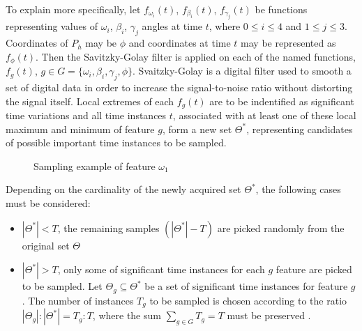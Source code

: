To explain more specifically, let $f_{\omega_i}(t)$, $f_{\beta_i}(t)$, $f_{\gamma_j}(t)$ be functions representing values of $\omega_i$, $\beta_i$, $\gamma_j$ angles at time $t$, where $0 \leq i \leq 4$ and $1 \leq j \leq 3$. Coordinates of $P_h$ may be $\phi$ and coordinates at time $t$ may be represented as $f_{\phi}(t)$. Then the Savitzky-Golay filter \cite{savitzkty} is applied on each of the named functions, $f_g(t)$, $g \in G = \{\omega_i,\beta_i, \gamma_j, \phi\}$. Svaitzky-Golay is a digital filter used to smooth a set of digital data in order to increase the signal-to-noise ratio without distorting the signal itself. Local extremes of each $f_g(t)$ are to be indentified as significant time variations and all time instances $t$, associated with at least one of these local maximum and minimum of feature $g$, form a new set $\Theta^*$, representing candidates of possible important time instances to be sampled. 

\begin{figure}[h]
	\centering
    \qquad
    \caption{Sampling example of feature $\omega_1$}
\end{figure}

Depending on the cardinality of the newly acquired set $\Theta^*$, the following cases must be considered:

\begin{itemize}
	\item $|\Theta^*| < T$, the remaining samples $(|\Theta^*|-T)$ are picked randomly from the original set $\Theta$
	\item $|\Theta^*| > T$, only some of significant time instances for each $g$ feature are picked to be sampled. Let $\Theta_g \subseteq \Theta^*$ be a set of significant time instances for feature $g$. The number of instances $T_g$ to be sampled is chosen according to the ratio $|\Theta_g|:|\Theta^*| = T_g:T$, where the sum $\sum_{g \in G}{T_g} = T$ must be preserved \cite{avola}.
\end{itemize}


